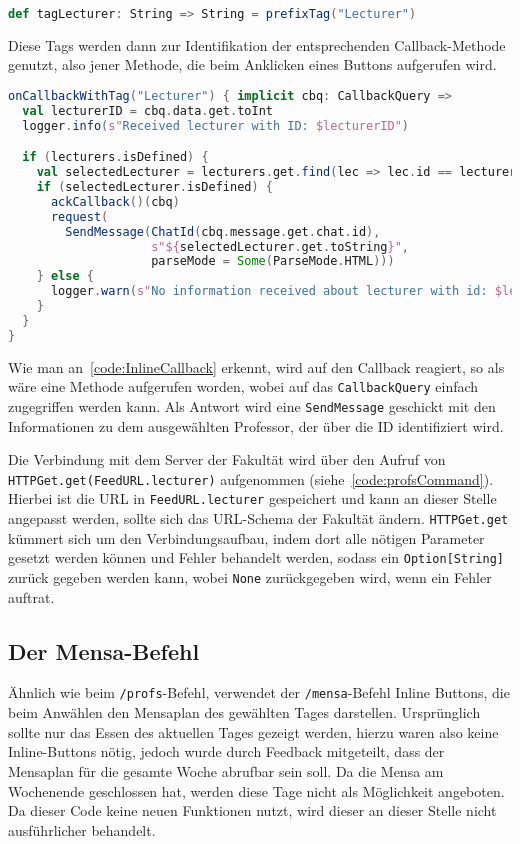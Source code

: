 \begin{lstlisting}[language=scala, style=scala, caption=Benutzung von Tags zur Identifikation von Callback-Methoden]
def tagLecturer: String => String = prefixTag("Lecturer")
\end{lstlisting}

Diese Tags werden dann zur Identifikation der entsprechenden Callback-Methode genutzt, also jener Methode, die beim Anklicken eines Buttons aufgerufen wird.

\begin{lstlisting}[language=scala, style=scala, caption=Callback-Funktionalität bei Inline-Buttons, label=code:InlineCallback]
onCallbackWithTag("Lecturer") { implicit cbq: CallbackQuery =>
  val lecturerID = cbq.data.get.toInt
  logger.info(s"Received lecturer with ID: $lecturerID")

  if (lecturers.isDefined) {
    val selectedLecturer = lecturers.get.find(lec => lec.id == lecturerID)
    if (selectedLecturer.isDefined) {
      ackCallback()(cbq)
      request(
        SendMessage(ChatId(cbq.message.get.chat.id),
                    s"${selectedLecturer.get.toString}",
                    parseMode = Some(ParseMode.HTML)))
    } else {
      logger.warn(s"No information received about lecturer with id: $lecturerID")
    }
  }
}
\end{lstlisting}

Wie man an~\autoref{code:InlineCallback} erkennt, wird auf den Callback reagiert, so als wäre eine Methode aufgerufen worden, wobei auf das \texttt{CallbackQuery} einfach zugegriffen werden kann. Als Antwort wird eine \texttt{SendMessage} geschickt mit den Informationen zu dem ausgewählten Professor, der über die ID identifiziert wird.

Die Verbindung mit dem Server der Fakultät wird über den Aufruf von \texttt{HTTPGet\allowbreak.get(\allowbreak FeedURL\allowbreak.lecturer)} aufgenommen (siehe~\autoref{code:profsCommand}). Hierbei ist die URL in \texttt{FeedURL\allowbreak.lecturer} gespeichert und kann an dieser Stelle angepasst werden, sollte sich das URL-Schema der Fakultät ändern. \texttt{HTTPGet.get} kümmert sich um den Verbindungsaufbau, indem dort alle nötigen Parameter gesetzt werden können und Fehler behandelt werden, sodass ein \texttt{Option[String]} zurück gegeben werden kann, wobei \texttt{None} zurückgegeben wird, wenn ein Fehler auftrat.

\subsection{Der Mensa-Befehl}
Ähnlich wie beim \texttt{/profs}-Befehl, verwendet der \texttt{/mensa}-Befehl Inline Buttons, die beim Anwählen den Mensaplan des gewählten Tages darstellen. Ursprünglich sollte nur das Essen des aktuellen Tages gezeigt werden, hierzu waren also keine Inline-Buttons nötig, jedoch wurde durch Feedback mitgeteilt, dass der Mensaplan für die gesamte Woche abrufbar sein soll. Da die Mensa am Wochenende geschlossen hat, werden diese Tage nicht als Möglichkeit angeboten. Da dieser Code keine neuen Funktionen nutzt, wird dieser an dieser Stelle nicht ausführlicher behandelt.

